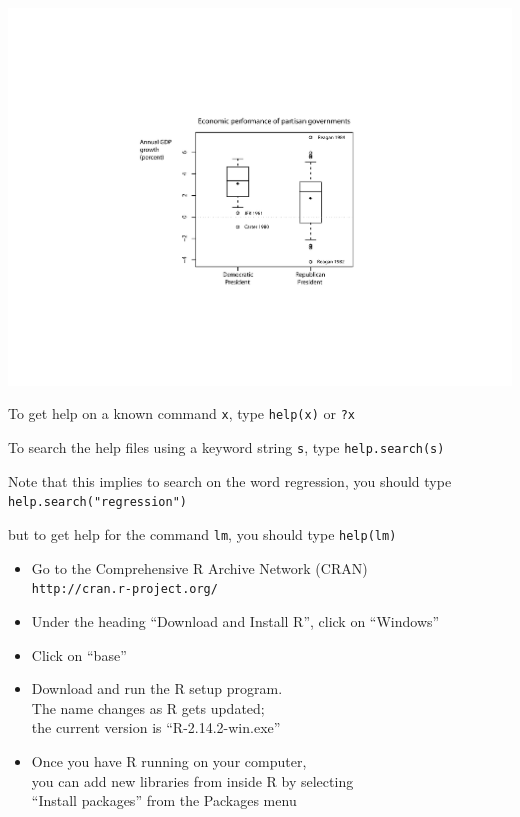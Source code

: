 \documentclass[pdflatex,landscape,titlepage]{foils}
\begin{document}
\begin{center}
\color{black}
\includegraphics[width=9 in]{gdpbox3}
\color{white}
\end{center}



\bgclear

To get help on a known command \texttt{x}, type \texttt{help(x)} or \texttt{?x}

To search the help files using a keyword string \texttt{s}, type \texttt{help.search(s)} 

Note that this implies to search on the word regression, you should type\\
\texttt{help.search("regression")} 

but to get help for the command \texttt{lm}, you should type
\texttt{help(lm)} 


\bgclear

\begin{itemize}
\item Go to the Comprehensive R Archive Network (CRAN) \\
      \texttt{http://cran.r-project.org/}

\item Under the heading ``Download and Install R'', click on ``Windows''

\item Click on ``base''

\item Download and run the R setup program.  \\
The name changes as R gets updated; \\
the current version is ``R-2.14.2-win.exe''

\item Once you have R running on your computer, \\
you can add new libraries from inside R by selecting \\
``Install packages'' from the Packages menu
\end{itemize}
\end{document}
